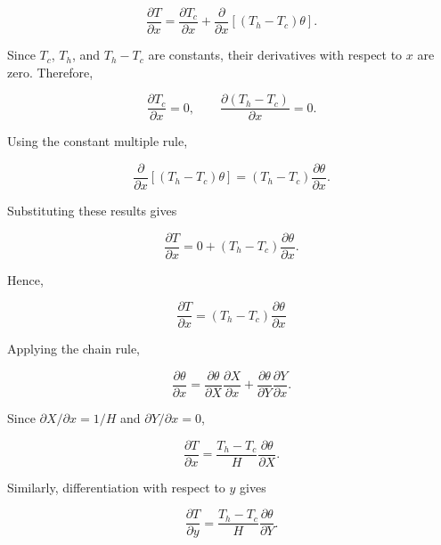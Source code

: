 \documentclass[preprint,3p,number]{elsarticle}
\begin{document}
\begin{equation}
\frac{\partial T}{\partial x}
=
\frac{\partial T_c}{\partial x}
+
\frac{\partial}{\partial x}
\left[(T_h-T_c)\theta\right].
\end{equation}

Since \(T_c\), \(T_h\), and \(T_h-T_c\) are constants,
their derivatives with respect to \(x\) are zero. Therefore,

\begin{equation}
\frac{\partial T_c}{\partial x}=0,
\qquad
\frac{\partial (T_h-T_c)}{\partial x}=0.
\end{equation}

Using the constant multiple rule,

\begin{equation}
\frac{\partial}{\partial x}
\left[(T_h-T_c)\theta\right]
=
(T_h-T_c)\frac{\partial\theta}{\partial x}.
\end{equation}

Substituting these results gives

\begin{equation}
\frac{\partial T}{\partial x}
=
0+(T_h-T_c)\frac{\partial\theta}{\partial x}.
\end{equation}

Hence,

\begin{equation}
\frac{\partial T}{\partial x}
=
(T_h-T_c)\frac{\partial\theta}{\partial x}
\end{equation}

Applying the chain rule,

\begin{equation}
\frac{\partial\theta}{\partial x}
=
\frac{\partial\theta}{\partial X}
\frac{\partial X}{\partial x}
+
\frac{\partial\theta}{\partial Y}
\frac{\partial Y}{\partial x}.
\end{equation}

Since \(\partial X/\partial x=1/H\) and
\(\partial Y/\partial x=0\),

\begin{equation}
\frac{\partial T}{\partial x}
=
\frac{T_h-T_c}{H}
\frac{\partial\theta}{\partial X}.
\label{eq:dT_dx}
\end{equation}

Similarly, differentiation with respect to \(y\) gives

\begin{equation}
\frac{\partial T}{\partial y}
=
\frac{T_h-T_c}{H}
\frac{\partial\theta}{\partial Y}.
\label{eq:dT_dy}
\end{equation}
\end{document}
